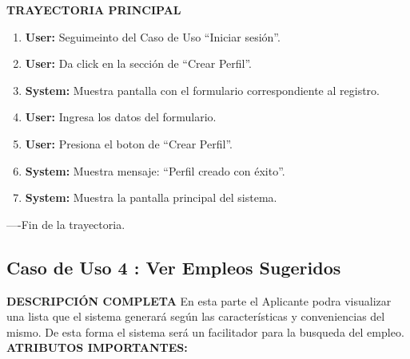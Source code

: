 \textbf{TRAYECTORIA PRINCIPAL}			
\begin{enumerate}			
\item \textbf{	User: 	}	Seguimeinto del Caso de Uso “Iniciar  sesión”.
\item \textbf{	User: 	}	Da click en la sección de “Crear Perfil”.
\item \textbf{	System: 	}	Muestra pantalla con el formulario correspondiente al registro.
\item \textbf{	User: 	}	Ingresa los datos del formulario.
\item \textbf{	User: 	}	Presiona el boton de “Crear Perfil”.
\item \textbf{	System: 	}	Muestra mensaje:  “Perfil creado con éxito”.
\item \textbf{	System: 	}	Muestra la pantalla principal del sistema.
			
			
\end{enumerate}			
----Fin de la trayectoria.			



\newpage			
\subsection{Caso de Uso 	4	: Ver Empleos Sugeridos	}
		\textbf{DESCRIPCIÓN COMPLETA}	
		\newline 	
		En esta parte el Aplicante podra visualizar una lista que el sistema generará según las características y conveniencias del mismo. De esta forma el sistema será un facilitador para la busqueda del empleo.	\newline \newline
		\textbf{ATRIBUTOS IMPORTANTES:}	

